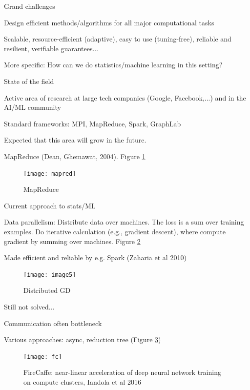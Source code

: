 \documentclass[english]{article}
\begin{document}
\item {Grand challenges}
\bitem
\item Design efficient methods/algorithms for all major computational tasks
\item Scalable, resource-efficient (adaptive), easy to use (tuning-free), reliable and resilient, verifiable guarantees...
\item More specific: How can we do statistics/machine learning in this setting? 
\eitem




\item {State of the field}
\bitem
\item Active area of research at large tech companies (Google, Facebook,...) and in the AI/ML community
\item Standard frameworks: MPI, MapReduce, Spark, GraphLab
\item Expected that this area will grow in the future. 
\eitem



\item {MapReduce (Dean, Ghemawat, 2004)}. Figure \ref{mr}
\begin{figure}
\begin{center}
\texttt{[image: mapred]}
    \caption{MapReduce}
    \label{mr}
\end{center}
\end{figure}




\item {Current approach to stats/ML}
\bitem
\item Data parallelism: Distribute data over machines. The loss is a sum over training examples. Do iterative calculation (e.g., gradient descent), where compute gradient by summing over machines. Figure \ref{dgd}
\item Made efficient and reliable by e.g. Spark (Zaharia et al 2010) 
\eitem
\begin{figure}
\begin{center}
\texttt{[image: image5]}
    \caption{Distributed GD}
    \label{dgd}
\end{center}
\end{figure}



\item {Still not solved...}
\bitem
\item Communication often bottleneck
\item Various approaches: async, reduction tree (Figure \ref{FireCaffe})
\eitem
\begin{figure}
\begin{center}
\texttt{[image: fc]}
\end{center}
\caption{FireCaffe: near-linear acceleration of deep neural network training
on compute clusters, Iandola et al 2016}
    \label{FireCaffe}
\end{figure}
\eenum
\end{document}
